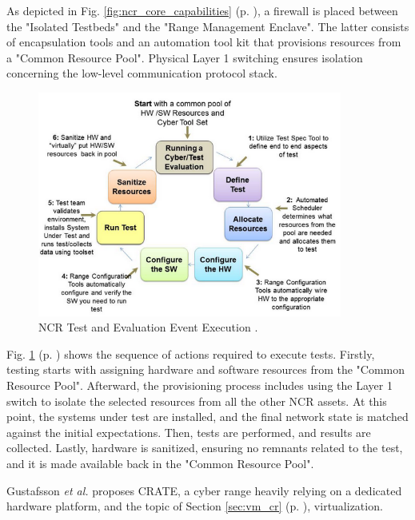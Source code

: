 As depicted in Fig. \ref{fig:ncr_core_capabilities} (p. \pageref{fig:ncr_core_capabilities}), a firewall is placed between the "Isolated Testbeds" and the "Range Management Enclave". The latter consists of encapsulation tools and an automation tool kit that provisions resources from a "Common Resource Pool". Physical Layer 1 switching ensures isolation concerning the low-level communication protocol stack.  

\begin{figure}[H]
    \includegraphics[width=10cm]{figures/ncr_test_evaluation.png}
    \caption{NCR Test and Evaluation Event Execution \cite{national_cr_ref}.}
    \label{fig:ncr_test_evaluation}
\end{figure}

Fig. \ref{fig:ncr_test_evaluation} (p. \pageref{fig:ncr_test_evaluation}) shows the sequence of actions required to execute tests. Firstly, testing starts with assigning hardware and software resources from the "Common Resource Pool". Afterward, the provisioning process includes using the Layer 1 switch to isolate the selected resources from all the other NCR assets. At this point, the systems under test are installed, and the final network state is matched against the initial expectations. Then, tests are performed, and results are collected. Lastly, hardware is sanitized, ensuring no remnants related to the test, and it is made available back in the "Common Resource Pool".

Gustafsson \textit{et al.} \cite{crate_ref} proposes CRATE, a cyber range heavily relying on a dedicated hardware platform, and the topic of Section \ref{sec:vm_cr} (p. \pageref{sec:vm_cr}), virtualization.

